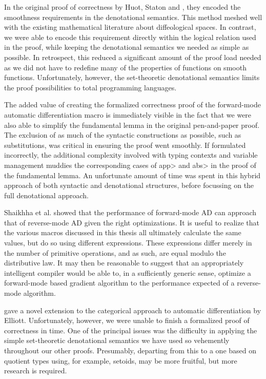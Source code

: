 In the original proof of correctness by Huot, Staton and \Vakar{}\cite{huot2020correctness}, they encoded the smoothness requirements in the denotational semantics.
This method meshed well with the existing mathematical literature about diffeological spaces.
In contrast, we were able to encode this requirement directly within the logical relation used in the proof, while keeping the denotational semantics we needed as simple as possible.
In retrospect, this reduced a significant amount of the proof load needed as we did not have to redefine many of the properties of functions on smooth functions.
Unfortunately, however, the set-theoretic denotational semantics limits the proof possibilities to total programming languages.

The added value of creating the formalized correctness proof of the forward-mode automatic differentiation macro is immediately visible in the fact that we were also able to simplify the fundamental lemma in the original pen-and-paper proof.
The exclusion of as much of the syntactic constructions as possible, such as substitutions, was critical in ensuring the proof went smoothly.
If formulated incorrectly, the additional complexity involved with typing contexts and variable management muddies the corresponding cases of \<app> and \<abs> in the proof of the fundamental lemma.
An unfortunate amount of time was spent in this hybrid approach of both syntactic and denotational structures, before focussing on the full denotational approach.

Shaikhha et al.\cite{Shaikha2019} showed that the performance of forward-mode AD can approach that of reverse-mode AD given the right optimizations.
It is useful to realize that the various macros discussed in this thesis all ultimately calculate the same values, but do so using different expressions.
These expressions differ merely in the number of primitive operations, and as such, are equal modulo the distributive law.
It may then be reasonable to suggest that an appropriately intelligent compiler would be able to, in a sufficiently generic sense, optimize a forward-mode based gradient algorithm to the performance expected of a reverse-mode algorithm.

\Vakar{}\cite{vkr2020reverse} gave a novel extension to the categorical approach to automatic differentiation by Elliott\cite{Elliott-2018-ad-icfp}.
Unfortunately, however, we were unable to finish a formalized proof of correctness in time.
One of the principal issues was the difficulty in applying the simple set-theoretic denotational semantics we have used so vehemently throughout our other proofs.
Presumably, departing from this to a one based on quotient types using, for example, setoids, may be more fruitful, but more research is required.
